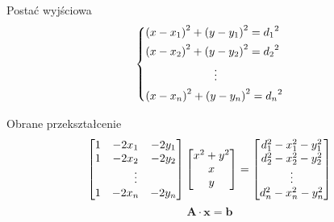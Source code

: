 \begin{frame}
    \begin{block}{Postać wyjściowa}
        \begin{equation*}
            \begin{dcases}
                {(x - x_1)}^2 + {(y - y_1)}^2 = {d_1}^2 \\
                {(x - x_2)}^2 + {(y - y_2)}^2 = {d_2}^2 \\
                \mspace{110mu}\vdots                    \\
                {(x - x_n)}^2 + {(y - y_n)}^2 = {d_n}^2
            \end{dcases}
        \end{equation*}
    \end{block}

    \begin{block}{Obrane przekształcenie}
        \begin{equation*}
            \left[
                \begin{matrix}
                    1 & -2x_1 & -2y_1  \\
                    1 & -2x_2 & -2y_2  \\
                    \multicolumn{3}{c}{\vdots} \\
                    1 & -2x_n & -2y_n \\
                \end{matrix}
                \right]
            \left[
                \begin{matrix}
                    x^2 + y^2 \\
                    x         \\
                    y         \\
                \end{matrix}
                \right]
            =
            \left[
                \begin{matrix}
                    d_1^2 - x_1^2 - y_1^2 \\
                    d_2^2 - x_2^2 - y_2^2 \\
                    \vdots                \\
                    d_n^2 - x_n^2 - y_n^2 \\
                \end{matrix}
                \right]
        \end{equation*}
        \begin{equation*}
            \mathbf{A} \cdot \mathbf{x} = \mathbf{b}
        \end{equation*}
    \end{block}
\end{frame}